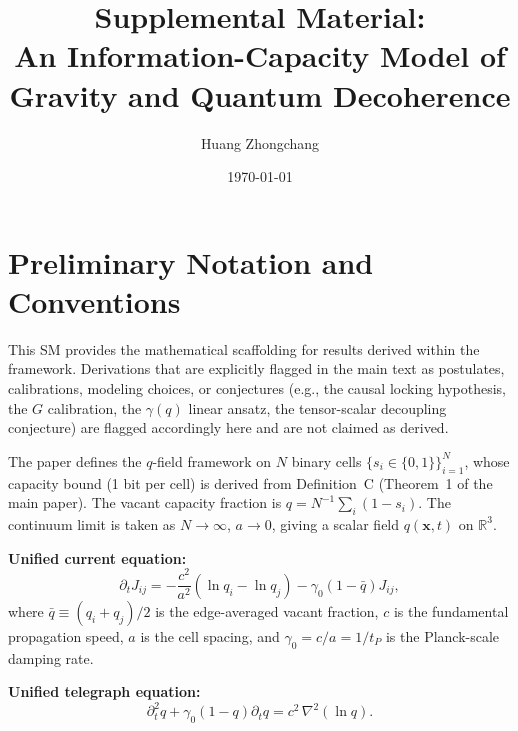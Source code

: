 \documentclass[reprint]{revtex4-2}
\begin{document}
\title{Supplemental Material:\\
An Information-Capacity Model of Gravity and Quantum Decoherence}

\author{Huang Zhongchang}

\date{\today}

\maketitle
\tableofcontents

\section{Preliminary Notation and Conventions}

This SM provides the mathematical scaffolding for results derived within the framework. Derivations that are explicitly flagged in the main text as postulates, calibrations, modeling choices, or conjectures (e.g., the causal locking hypothesis, the $G$ calibration, the $\gamma(q)$ linear ansatz, the tensor-scalar decoupling conjecture) are flagged accordingly here and are not claimed as derived.

The paper defines the $q$-field framework on $N$ binary cells $\{s_i\in\{0,1\}\}_{i=1}^N$, whose capacity bound (1 bit per cell) is derived from Definition~C (Theorem~1 of the main paper). The vacant capacity fraction is $q=N^{-1}\sum_i(1-s_i)$. The continuum limit is taken as $N\to\infty$, $a\to0$, giving a scalar field $q(\mathbf{x},t)$ on $\mathbb{R}^3$.

\textbf{Unified current equation:}
\begin{equation}
\partial_t J_{ij} = -\frac{c^2}{a^2}(\ln q_i - \ln q_j) - \gamma_0(1-\bar{q})J_{ij},
\label{eq:unified_current}
\end{equation}
where $\bar{q} \equiv (q_i+q_j)/2$ is the edge-averaged vacant fraction, $c$ is the fundamental propagation speed, $a$ is the cell spacing, and $\gamma_0 = c/a = 1/t_P$ is the Planck-scale damping rate.

\textbf{Unified telegraph equation:}
\begin{equation}
\boxed{\partial_t^2 q + \gamma_0(1-q)\partial_t q = c^2\,\nabla^2(\ln q)}.
\label{eq:unified_telegraph}
\end{equation}
\end{document}
